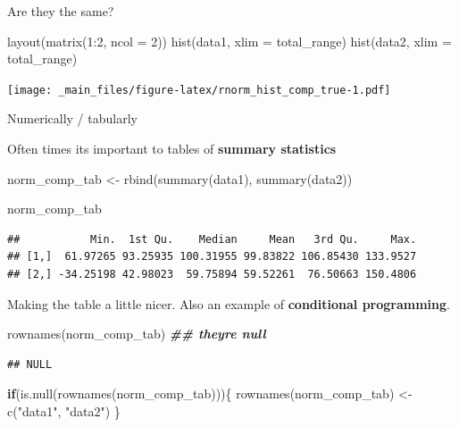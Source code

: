 \documentclass[
]{book}
\newenvironment{Shaded}{\begin{snugshade}}{\end{snugshade}}
\newcommand{\AttributeTok}[1]{\textcolor[rgb]{0.77,0.63,0.00}{#1}}
\newcommand{\ControlFlowTok}[1]{\textcolor[rgb]{0.13,0.29,0.53}{\textbf{#1}}}
\newcommand{\DecValTok}[1]{\textcolor[rgb]{0.00,0.00,0.81}{#1}}
\newcommand{\DocumentationTok}[1]{\textcolor[rgb]{0.56,0.35,0.01}{\textbf{\textit{#1}}}}
\newcommand{\FunctionTok}[1]{\textcolor[rgb]{0.00,0.00,0.00}{#1}}
\newcommand{\NormalTok}[1]{#1}
\newcommand{\OtherTok}[1]{\textcolor[rgb]{0.56,0.35,0.01}{#1}}
\newcommand{\SpecialCharTok}[1]{\textcolor[rgb]{0.00,0.00,0.00}{#1}}
\newcommand{\StringTok}[1]{\textcolor[rgb]{0.31,0.60,0.02}{#1}}
\begin{document}
Are they the same?

\begin{Shaded}
\begin{Highlighting}[]
\FunctionTok{layout}\NormalTok{(}\FunctionTok{matrix}\NormalTok{(}\DecValTok{1}\SpecialCharTok{:}\DecValTok{2}\NormalTok{, }\AttributeTok{ncol =} \DecValTok{2}\NormalTok{))}
\FunctionTok{hist}\NormalTok{(data1, }\AttributeTok{xlim =}\NormalTok{ total\_range)}
\FunctionTok{hist}\NormalTok{(data2, }\AttributeTok{xlim =}\NormalTok{ total\_range)}
\end{Highlighting}
\end{Shaded}

\texttt{[image: \_main\_files/figure-latex/rnorm\_hist\_comp\_true-1.pdf]}

Numerically / tabularly

Often times its important to tables of \textbf{summary statistics}

\begin{Shaded}
\begin{Highlighting}[]
\NormalTok{norm\_comp\_tab }\OtherTok{\textless{}{-}} \FunctionTok{rbind}\NormalTok{(}\FunctionTok{summary}\NormalTok{(data1),}
                       \FunctionTok{summary}\NormalTok{(data2))}

\NormalTok{norm\_comp\_tab}
\end{Highlighting}
\end{Shaded}

\begin{verbatim}
##           Min.  1st Qu.    Median     Mean   3rd Qu.     Max.
## [1,]  61.97265 93.25935 100.31955 99.83822 106.85430 133.9527
## [2,] -34.25198 42.98023  59.75894 59.52261  76.50663 150.4806
\end{verbatim}

Making the table a little nicer. Also an example of \textbf{conditional programming}.

\begin{Shaded}
\begin{Highlighting}[]
\FunctionTok{rownames}\NormalTok{(norm\_comp\_tab) }\DocumentationTok{\#\# they\textquotesingle{}re null}
\end{Highlighting}
\end{Shaded}

\begin{verbatim}
## NULL
\end{verbatim}

\begin{Shaded}
\begin{Highlighting}[]
\ControlFlowTok{if}\NormalTok{(}\FunctionTok{is.null}\NormalTok{(}\FunctionTok{rownames}\NormalTok{(norm\_comp\_tab)))\{}
  \FunctionTok{rownames}\NormalTok{(norm\_comp\_tab) }\OtherTok{\textless{}{-}} \FunctionTok{c}\NormalTok{(}\StringTok{"data1"}\NormalTok{, }\StringTok{"data2"}\NormalTok{)}
\NormalTok{\}}
\end{Highlighting}
\end{Shaded}
\end{document}
